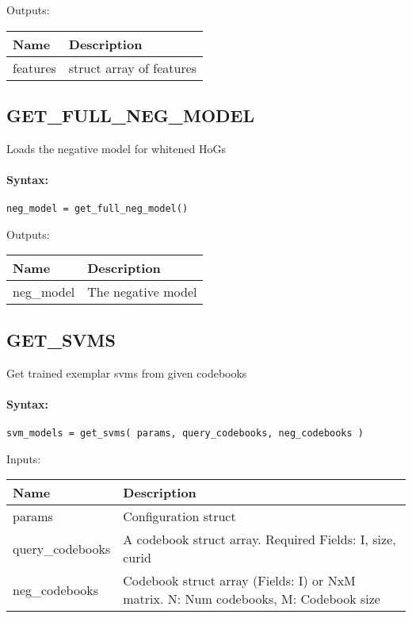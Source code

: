 \bigskip
Outputs:

\begin{tabular}{|p{}|p{}|}
\hline
\textbf{Name} & \textbf{Description} \\
\hline \hline
features & struct array of features  \\ \hline
\end{tabular}

\subsection{GET\_FULL\_NEG\_MODEL}

Loads the negative model for whitened HoGs

\paragraph{Syntax:} \verb|neg_model = get_full_neg_model()|

\bigskip
Outputs:

\begin{tabular}{|p{}|p{}|}
\hline
\textbf{Name} & \textbf{Description} \\
\hline \hline
neg\_model & The negative model  \\ \hline
\end{tabular}

\subsection{GET\_SVMS}

Get trained exemplar svms from given codebooks

\paragraph{Syntax:} \verb|svm_models = get_svms( params, query_codebooks, neg_codebooks )|

\bigskip
Inputs:

\begin{tabular}{|p{}|p{}|}
\hline
\textbf{Name} & \textbf{Description} \\
\hline \hline
params & Configuration struct  \\ \hline
query\_codebooks & A codebook struct array. Required Fields: I, size, curid  \\ \hline
neg\_codebooks & Codebook struct array (Fields: I) or NxM matrix. N: Num codebooks, M: Codebook size  \\ \hline
\end{tabular}

